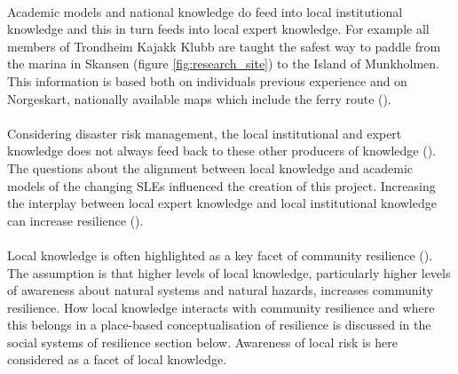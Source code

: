 \paragraph{}

Academic models and national knowledge do feed into local institutional knowledge and this in turn feeds into local expert knowledge. For example all members of Trondheim Kajakk Klubb are taught the safest way to paddle from the marina in Skansen (figure \ref{fig:research_site}) to the Island of Munkholmen. This information is based both on individuals previous experience and on Norgeskart, nationally available maps which include the ferry route (\cite{kartverket_norgeskart_2023}). 

\paragraph{}
Considering disaster risk management, the local institutional and expert knowledge does not always feed back to these other producers of knowledge (\cite{rod_integrated_2012}). The questions about the alignment between local knowledge and academic models of the changing SLEs influenced the creation of this project. Increasing the interplay between local expert knowledge and local institutional knowledge can increase resilience (\cite{setten_we_2019}).

\paragraph{}

Local knowledge is often highlighted as a key facet of community resilience (\cite{setten_we_2019}). The assumption is that higher levels of local knowledge, particularly higher levels of awareness about natural systems and natural hazards, increases community resilience.  How local knowledge interacts with community resilience and where this belongs in a place-based conceptualisation of resilience is discussed in the social systems of resilience section below. Awareness of local risk is here considered as a facet of local knowledge.  


 
